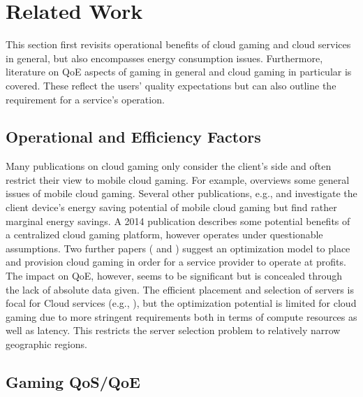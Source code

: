 \section{Related Work}
\label{sec:relatedwork}

This section first revisits operational benefits of cloud gaming and cloud services in general, but also encompasses energy consumption issues. Furthermore, literature on \gls{QoE} aspects of gaming in general and cloud gaming in particular is covered. These reflect the users' quality expectations but can also outline the requirement for a service's operation.


\subsection{Operational and Efficiency Factors}

Many publications on cloud gaming only consider the client's side and often restrict their view to mobile cloud gaming. For example, \cite{Soliman2013} overviews some general issues of mobile cloud gaming. Several other publications, e.g., \cite{6924295} and \cite{Huang:2014:MCP:2755535.2755542} investigate the client device's energy saving potential of mobile cloud gaming but find rather marginal energy savings. A 2014 publication \cite{6882299} describes some potential benefits of a centralized cloud gaming platform, however operates under questionable assumptions. Two further papers (\cite{6853364} and \cite{6365107}) suggest an optimization model to place and provision cloud gaming  in order for a service provider to operate at profits. The impact on \gls{QoE}, however, seems to be significant but is concealed through the lack of absolute data given. The efficient placement and selection of servers is focal for Cloud services (e.g., \cite{6740249}), but the optimization potential is limited for cloud gaming due to more stringent requirements both in terms of compute resources as well as latency. This restricts the server selection problem to relatively narrow geographic regions.


\subsection{Gaming QoS/QoE}

